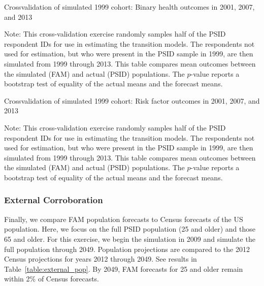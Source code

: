 \begin{table}[H]
\begin{threeparttable}
\caption{Crossvalidation of simulated 1999 cohort: Binary health outcomes in 2001, 2007, and 2013}
\label{table:crossval_binhlth}
\centering
\footnotesize

\begin{tablenotes}
\footnotesize
\item Note: This cross-validation exercise randomly samples half of the PSID respondent IDs for use in estimating the transition models. The respondents not used for estimation, but who were present in the PSID sample in 1999, are then simulated from 1999 through 2013. This table compares mean outcomes between the simulated (FAM) and actual (PSID) populations. The $p$-value reports a bootstrap test of equality of the actual means and the forecast means.
\end{tablenotes}
\end{threeparttable}
\end{table}

\begin{table}[H]
\begin{threeparttable}
\caption{Crossvalidation of simulated 1999 cohort: Risk factor outcomes in 2001, 2007, and 2013}
\label{table:crossval_risk}
\centering
\footnotesize

\begin{tablenotes}
\footnotesize
\item Note: This cross-validation exercise randomly samples half of the PSID respondent IDs for use in estimating the transition models. The respondents not used for estimation, but who were present in the PSID sample in 1999, are then simulated from 1999 through 2013. This table compares mean outcomes between the simulated (FAM) and actual (PSID) populations. The $p$-value reports a bootstrap test of equality of the actual means and the forecast means.
\end{tablenotes}
\end{threeparttable}
\end{table}

\subsubsection{External Corroboration}
\noindent Finally, we compare FAM population forecasts to Census forecasts of the US population. Here, we focus on the full PSID population (25 and older) and those 65 and older. For this exercise, we begin the simulation in 2009 and simulate the full population through 2049. Population projections are compared to the 2012 Census projections for years 2012 through 2049. See results in Table~\ref{table:external_pop}. By 2049, FAM forecasts for 25 and older remain within 2\% of Census forecasts.

